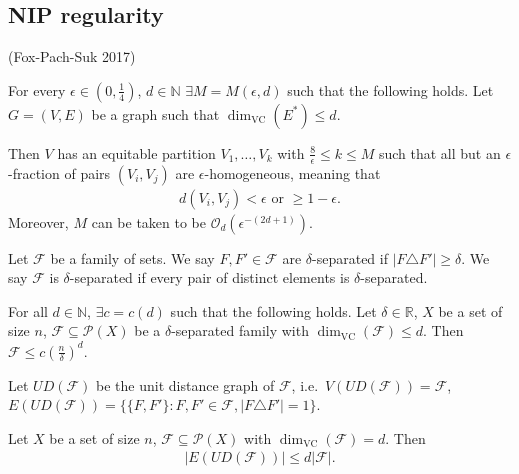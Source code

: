 \documentclass{article}
\begin{document}
\subsection{NIP regularity}
(Fox-Pach-Suk 2017)
\begin{thm}
  For every $\epsilon \in (0, \frac{1}{4})$, $d \in \mathbb{N}$ $\exists M = M(\epsilon,d)$ such that the following holds.
  Let $G = (V,E)$ be a graph such that $\dim_{\text{VC}}(E^*) \leq d$.

  Then $V$ has an equitable partition $V_1, \dotsc, V_k$ with $\frac{8}{\epsilon} \leq k \leq M$ such that all but an $\epsilon$-fraction of pairs $(V_i,V_j)$ are $\epsilon$-homogeneous, meaning that
  \begin{align*}
    d(V_i,V_j) < \epsilon \text{ or } \geq 1-\epsilon.
  \end{align*}
  Moreover, $M$ can be taken to be $\mathcal{O}_d(\epsilon^{-(2d+1)})$.
\end{thm}
\begin{defi}
  Let $\mathcal{F}$ be a family of sets. We say $F,F' \in \mathcal{F}$ are $\delta$-separated if $|F \triangle F'| \geq \delta$.
  We say $\mathcal{F}$ is $\delta$-separated if every pair of distinct elements is $\delta$-separated.
\end{defi}
\begin{lemma}
  For all $d \in \mathbb{N}$, $\exists c = c(d)$ such that the following holds.
  Let $\delta \in \mathbb{R}$, $X$ be a set of size $n$, $\mathcal{F} \subseteq \mathcal{P}(X)$ be a $\delta$-separated family with $\dim_{\text{VC}}(\mathcal{F})\leq d$. Then $\mathcal{F} \leq c (\frac{n}{\delta})^d$.
\end{lemma}
Let $UD(\mathcal{F})$ be the unit distance graph of $\mathcal{F}$, i.e.\ $V(UD(\mathcal{F})) = \mathcal{F}$, $E(UD(\mathcal{F})) = \{\{F,F'\} : F,F' \in \mathcal{F}, |F \triangle F'| = 1\}$.
\begin{lemma}
  Let $X$ be a set of size $n$, $\mathcal{F} \subseteq \mathcal{P}(X)$ with $\dim_{\text{VC}}(\mathcal{F})=d$. Then
  \begin{align*}
    |E(UD(\mathcal{F}))| \leq d |\mathcal{F}|.
  \end{align*}
\end{lemma}
\end{document}
